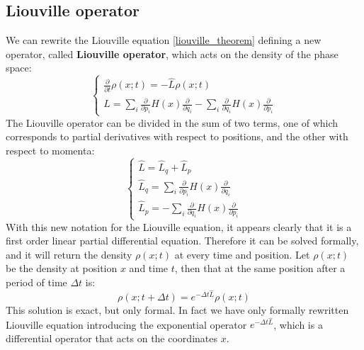             \subsection{Liouville operator}

            We can rewrite the Liouville equation \eqref{liouville_theorem} defining a new operator, called \textbf{Liouville operator}, which acts on the density of the phase space:
            \begin{equation}
            \begin{cases}
                \frac{\partial}{\partial t}\rho(x;t)=-\hat{L}\rho(x;t)\\
                \hat{L}=\sum_i\frac{\partial}{\partial p_i}H(x)\frac{\partial}{\partial q_i}-\sum_i\frac{\partial}{\partial q_i}H(x)\frac{\partial}{\partial p_i}
            \end{cases}
            \end{equation}
            The Liouville operator can be divided in the sum of two terms, one of which corresponds to partial derivatives with respect to positions, and the other with respect to momenta:
            \begin{equation}
                \begin{cases}
                    \hat{L}=\hat{L}_q+\hat{L}_p\\
                    \hat{L}_q=\sum_i\frac{\partial}{\partial p_i}H(x)\frac{\partial}{\partial q_i}\\
                    \hat{L}_p=-\sum_i\frac{\partial}{\partial q_i}H(x)\frac{\partial}{\partial p_i}
                \end{cases}
            \end{equation}
            With this new notation for the Liouville equation, it appears clearly that it is a first order linear partial differential equation. Therefore it can be solved formally, and it will return the density $\rho(x;t)$ at every time and position. Let $\rho(x;t)$ be the density at position $x$ and time $t$, then that at the same position after a period of time $\Delta t$ is:
            \begin{equation}\label{eq:Liouvillesol}
                \rho(x;t+\Delta t)=e^{-\Delta t \hat{L}}\rho(x;t)
            \end{equation}
            This solution is exact, but only formal. In fact we have only formally rewritten Liouville equation introducing the exponential operator $e^{-\Delta t\hat{L}}$, which is a differential operator that acts on the coordinates $x$.
            
